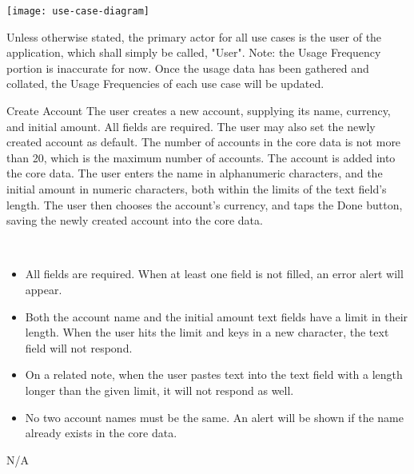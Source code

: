 
\texttt{[image: use-case-diagram]}


Unless otherwise stated, the primary actor for all use cases is the user of the application, which shall simply be called, "User". Note: the Usage Frequency portion is inaccurate for now. Once the usage data has been gathered and collated, the Usage Frequencies of each use case will be updated.

	{Create Account}
    {The user creates a new account, supplying its name, currency, and initial amount. All fields are required. The user may also set the newly created account as default.}
    {The number of accounts in the core data is not more than 20, which is the maximum number of accounts.}
    {The account is added into the core data.}
    {The user enters the name in alphanumeric characters, and the initial amount in numeric characters, both within the limits of the text field's length. The user then chooses the account's currency, and taps the Done button, saving the newly created account into the core data.}
    {
    ~ 
    \begin{itemize}
		\item All fields are required. When at least one field is not filled, an error alert will appear.
        \item Both the account name and the initial amount text fields have a limit in their length. When the user hits the limit and keys in a new character, the text field will not respond.
        \item On a related note, when the user pastes text into the text field with a length longer than the given limit, it will not respond as well.
        \item No two account names must be the same. An alert will be shown if the name already exists in the core data.
    \end{itemize}    
    }
    {N/A}
    

